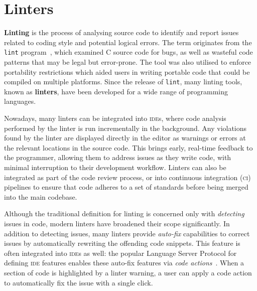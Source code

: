 \documentclass[../../main.tex]{subfiles}
\begin{document}
\section{Linters}
\textbf{Linting} is the process of analysing source code to identify and report issues related to coding style and potential logical errors.
The term originates from the \texttt{lint} program~\cite{johnson_lint_1978}, which examined C source code for bugs, as well as wasteful code patterns that may be legal but error-prone.
The tool was also utilised to enforce portability restrictions which aided users in writing portable code that could be compiled on multiple platforms.
Since the release of \texttt{lint}, many linting tools, known as \textbf{linters}, have been developed for a wide range of programming languages.

Nowadays, many linters can be integrated into \textsc{ide}s, where code analysis performed by the linter is run incrementally in the background.
Any violations found by the linter are displayed directly in the editor as warnings or errors at the relevant locations in the source code.
This brings early, real-time feedback to the programmer, allowing them to address issues as they write code, with minimal interruption to their development workflow.
Linters can also be integrated as part of the code review process, or into continuous integration (\textsc{ci}) pipelines to ensure that code adheres to a set of standards before being merged into the main codebase.

Although the traditional definition for linting is concerned only with \emph{detecting} issues in code, modern linters have broadened their scope significantly.
In addition to detecting issues, many linters provide \emph{auto-fix} capabilities to correct issues by automatically rewriting the offending code snippets.
This feature is often integrated into \textsc{ide}s as well: the popular Language Server Protocol for defining \textsc{ide} features enables these auto-fix features via \emph{code actions}~\cite{gunasinghe_lsp_2022}.
When a section of code is highlighted by a linter warning, a user can apply a code action to automatically fix the issue with a single click.

\end{document}
